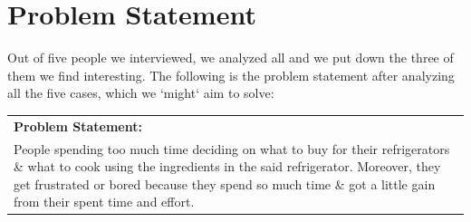 \documentclass[a4paper,11pt,oneside]{scrreprt}
\begin{document}
	\section{Problem Statement}
		Out of five people we interviewed, we analyzed all and we put down the three of them we find interesting. The following is the problem statement after analyzing all the five cases, which we `might` aim to solve:\\
		
	
		\begin{tabularx}{\textwidth}{|X|}
	
			\hline
				\textbf{Problem Statement:}\\
				
				People spending too much time deciding on what to buy for their refrigerators \& what to cook using the ingredients in the said refrigerator. Moreover, they get frustrated or bored because they spend so much time \& got a little gain from their spent time and effort.\\
				
			\hline
			
		\end{tabularx}



\end{document}
